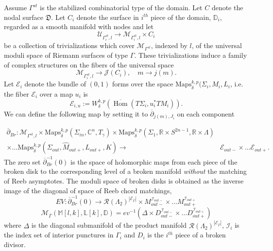 \documentclass[11pt, oneside,dvipsnames]{amsart}
\renewcommand{\to}{\rightarrow}
\newcommand{\C}{\mathbb{C}}
\newcommand{\R}{\mathbb{R}}
\newcommand{\delbar}{\overline{\partial}}
\newcommand{\inv}{^{-1}}
\newcommand{\Maps}{\text{Maps}}
\renewcommand{\to}{\rightarrow}
\newcommand{\<}{\langle}
\renewcommand{\>}{\rangle}
\newcommand{\outp}{{out+}}
\newcommand{\outm}{{out-}}
\newcommand{\M}{\mathcal{M}}
\newcommand{\bD}{\mathbb{D}}
\newcommand{\cE}{\mathcal{E}}
\newcommand{\cI}{\mathcal{I}}
\newcommand{\cM}{\mathcal{M}}
\newcommand{\cR}{\mathcal{R}}
\renewcommand{\th}{^{th}}
\renewcommand{\to}{\rightarrow}
\theoremstyle{definition}
\theoremstyle{definition}
\numberwithin{equation}{subsection}
\begin{document}
Assume $\Gamma^{st}$ is the stabilized combinatorial type of the domain. Let $C$ denote the nodal surface $\mathfrak{D}$. Let $C_i$ denote the surface in $i\th$ piece of the domain, $\mathbb D_i$, regarded as a smooth manifold with nodes and let 
\begin{equation}\label{domtriv}
    \mathcal{U}_{\Gamma^{st}_i,l} \to \mathcal{M}_{\Gamma^{st}_i,l} \times C_i
\end{equation}
be a collection of trivializations which cover $\cM_{\Gamma^{st}}$, indexed by $l$, of the universal moduli space of Riemann surfaces of type $\Gamma$. These trivializations induce a family of complex structures on the fibers of the universal space \begin{equation}\label{domchoice}
    \M_{\Gamma^{st}_i,l} \to \mathcal{J}(C_i), \quad m\to j(m).
\end{equation}
\noindent Let $\mathcal{E}_i$ denote the bundle of $(0,1)$ forms over the space $\Maps^{k,p}_{\delta}(\Sigma_i,M_i ,L_i$, i.e. the fiber $\mathcal{E}_i$ over a map $u_i$ is 
\begin{equation*}
    \mathcal{E}_{i,u}:= W^{k,p}_\delta ( \overline{\operatorname{Hom}}( T\Sigma_i,u_i^*TM_i)).
\end{equation*}
We can define the following map by setting it to $\delbar_{j(m),J_i}$ on each component 

\begin{align*}
    \delbar_{Br} :\mathcal{M}_{\Gamma^{st},l}\times \Maps^{k,p}_{\delta}(\Sigma_{in},\C^n,T_\gamma) \times \Maps^{k,p}_{\delta}(\Sigma_1,\R \times S^{2n-1},\R \times \Lambda)\\ \times \dots \Maps^{k,p}_{\delta}(\Sigma_{out},\widehat M_{out+},L_{out+},K)\to &\mathcal{E}_{out-}\times \dots \mathcal{E}_{out+}.
\end{align*}
\noindent The zero set $\delbar_{Br}\inv (0)$ is the space of holomorphic maps from each piece of the broken disk to the corresponding level of a broken manifold \textit{without} the matching of Reeb asymptotes. The moduli space of broken disks  is obtained as the inverse image of the diagonal of space of Reeb chord matchings,
$$EV: \delbar_{Br}\inv (0)  \to \cR(\Lambda_2)^{|\cE_{\overline{\Gamma}}|} \times M_\outm^{\cI_\outm} \times \dots M_\outp^{\cI_\outp} $$
$$\mathcal{M}_{\overline{\Gamma}}(\mathbb{M}[l,k],\mathbb{L}[k],\bD) = ev\inv(\Delta \times D_\outm ^{\cI_\outm}  \times \dots D_\outp^{\cI_\outp} )$$
where $\Delta$ is the diagonal submanifold of the product manifold $\cR(\Lambda_2)^{|\cE_{\overline{\Gamma}}|}$, $\cI_i$ is the index set of interior punctures in $\Gamma_i$ and $D_i$ is the $i\th$ piece of a broken divisor.
\end{document}
